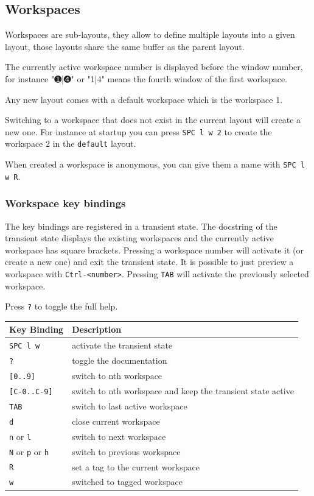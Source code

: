 \documentclass[11pt]{article}
\begin{document}
\subsection{Workspaces}
\label{sec:org94e6d64}
Workspaces are sub-layouts, they allow to define multiple layouts into a given
layout, those layouts share the same buffer as the parent layout.

The currently active workspace number is displayed before the window number,
for instance "➊|➍" or "1|4" means the fourth window of the first workspace.

Any new layout comes with a default workspace which is the workspace 1.

Switching to a workspace that does not exist in the current layout will create a
new one. For instance at startup you can press \texttt{SPC l w 2} to create the
workspace 2 in the \texttt{default} layout.

When created a workspace is anonymous, you can give them a name with
\texttt{SPC l w R}.

\subsubsection{Workspace key bindings}
\label{sec:org9e65e87}
The key bindings are registered in a transient state. The docstring of the
transient state displays the existing workspaces and the currently active
workspace has square brackets. Pressing a workspace number will activate it (or
create a new one) and exit the transient state. It is possible to just preview a
workspace with \texttt{Ctrl-<number>}. Pressing \texttt{TAB} will activate the previously
selected workspace.

Press \texttt{?} to toggle the full help.

\begin{center}
\begin{tabular}{ll}
Key Binding & Description\\
\hline
\texttt{SPC l w} & activate the transient state\\
\texttt{?} & toggle the documentation\\
\texttt{[0..9]} & switch to nth workspace\\
\texttt{[C-0..C-9]} & switch to nth workspace and keep the transient state active\\
\texttt{TAB} & switch to last active workspace\\
\texttt{d} & close current workspace\\
\texttt{n} or \texttt{l} & switch to next workspace\\
\texttt{N} or \texttt{p} or \texttt{h} & switch to previous workspace\\
\texttt{R} & set a tag to the current workspace\\
\texttt{w} & switched to tagged workspace\\
\end{tabular}
\end{center}
\end{document}
